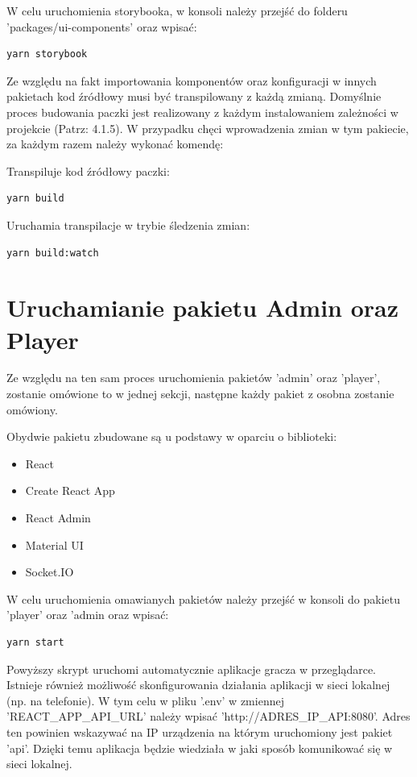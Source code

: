 W celu uruchomienia storybooka, w konsoli należy przejść do folderu 'packages/ui-components' oraz wpisać:

\begin{lstlisting}
yarn storybook
\end{lstlisting}

Ze względu na fakt importowania komponentów oraz konfiguracji w innych pakietach kod źródłowy musi być transpilowany z każdą zmianą. Domyślnie proces budowania paczki jest realizowany z każdym instalowaniem zależności w projekcie (Patrz: 4.1.5). W przypadku chęci wprowadzenia zmian w tym pakiecie, za każdym razem należy wykonać komendę:

Transpiluje kod źródłowy paczki:
\begin{lstlisting}
yarn build
\end{lstlisting}

Uruchamia transpilacje w trybie śledzenia zmian:
\begin{lstlisting}
yarn build:watch
\end{lstlisting}

\section{Uruchamianie pakietu Admin oraz Player}
Ze względu na ten sam proces uruchomienia pakietów 'admin' oraz 'player', zostanie omówione to w jednej sekcji, następne każdy pakiet z osobna zostanie omówiony.

Obydwie pakietu zbudowane są u podstawy w oparciu o biblioteki:

\begin{itemize}
    \item React
	\item Create React App
	\item React Admin
	\item Material UI
	\item Socket.IO
\end{itemize}


W celu uruchomienia omawianych pakietów należy przejść w konsoli do pakietu 'player' oraz 'admin oraz wpisać:

\begin{lstlisting}
yarn start
\end{lstlisting}

Powyższy skrypt uruchomi automatycznie aplikacje gracza w przeglądarce. Istnieje również możliwość skonfigurowania działania aplikacji w sieci lokalnej (np. na telefonie). W tym celu w pliku '.env' w zmiennej 'REACT\_APP\_API\_URL' należy wpisać 'http://{ADRES\_IP\_API}:8080'. Adres ten powinien wskazywać na IP urządzenia na którym uruchomiony jest pakiet 'api'. Dzięki temu aplikacja będzie wiedziała w jaki sposób komunikować się w sieci lokalnej.

